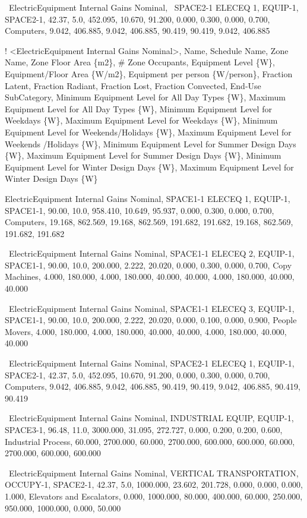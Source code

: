 ~ElectricEquipment Internal Gains Nominal,~ SPACE2-1 ELECEQ 1, EQUIP-1, SPACE2-1, 42.37, 5.0, 452.095, 10.670, 91.200, 0.000, 0.300, 0.000, 0.700, Computers, 9.042, 406.885, 9.042, 406.885, 90.419, 90.419, 9.042, 406.885


! \textless{}ElectricEquipment Internal Gains Nominal\textgreater{}, Name, Schedule Name, Zone Name, Zone Floor Area \{m2\}, \# Zone Occupants, Equipment Level \{W\}, Equipment/Floor Area \{W/m2\}, Equipment per person \{W/person\}, Fraction Latent, Fraction Radiant, Fraction Lost, Fraction Convected, End-Use SubCategory, Minimum Equipment Level for All Day Types \{W\}, Maximum Equipment Level for All Day Types \{W\}, Minimum Equipment Level for Weekdays \{W\},  Maximum Equipment Level for Weekdays \{W\}, Minimum Equipment Level for Weekends/Holidays \{W\},  Maximum Equipment Level for Weekends /Holidays \{W\}, Minimum Equipment Level for Summer Design Days \{W\},  Maximum Equipment Level for Summer Design Days \{W\}, Minimum Equipment Level for Winter Design Days \{W\}, Maximum Equipment Level for Winter Design Days \{W\}

 ElectricEquipment Internal Gains Nominal, SPACE1-1 ELECEQ 1, EQUIP-1, SPACE1-1, 90.00, 10.0, 958.410, 10.649, 95.937, 0.000, 0.300, 0.000, 0.700, Computers, 19.168, 862.569, 19.168, 862.569, 191.682, 191.682, 19.168, 862.569, 191.682, 191.682

~ElectricEquipment Internal Gains Nominal, SPACE1-1 ELECEQ 2, EQUIP-1, SPACE1-1, 90.00, 10.0, 200.000, 2.222, 20.020, 0.000, 0.300, 0.000, 0.700, Copy Machines, 4.000, 180.000, 4.000, 180.000, 40.000, 40.000, 4.000, 180.000, 40.000, 40.000

~ElectricEquipment Internal Gains Nominal,  SPACE1-1 ELECEQ 3, EQUIP-1, SPACE1-1, 90.00, 10.0, 200.000, 2.222, 20.020, 0.000, 0.100, 0.000, 0.900, People Movers, 4.000, 180.000, 4.000, 180.000, 40.000, 40.000, 4.000, 180.000, 40.000, 40.000

~ElectricEquipment Internal Gains Nominal, SPACE2-1 ELECEQ 1, EQUIP-1, SPACE2-1, 42.37, 5.0, 452.095, 10.670, 91.200, 0.000, 0.300, 0.000, 0.700, Computers, 9.042, 406.885, 9.042, 406.885, 90.419, 90.419, 9.042, 406.885, 90.419, 90.419

~ElectricEquipment Internal Gains Nominal, INDUSTRIAL EQUIP, EQUIP-1, SPACE3-1, 96.48, 11.0, 3000.000, 31.095, 272.727, 0.000, 0.200, 0.200, 0.600, Industrial Process, 60.000, 2700.000, 60.000, 2700.000, 600.000, 600.000, 60.000, 2700.000, 600.000, 600.000

~ElectricEquipment Internal Gains Nominal, VERTICAL TRANSPORTATION, OCCUPY-1, SPACE2-1, 42.37, 5.0, 1000.000, 23.602, 201.728, 0.000, 0.000, 0.000, 1.000, Elevators and Escalators, 0.000, 1000.000, 80.000, 400.000, 60.000, 250.000, 950.000, 1000.000, 0.000, 50.000

